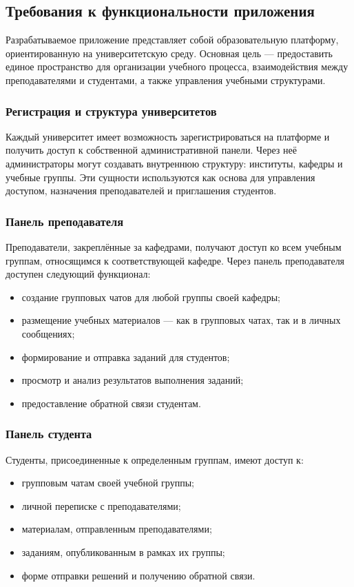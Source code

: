 \subsection{Требования к функциональности приложения}

Разрабатываемое приложение представляет собой образовательную платформу, ориентированную на университетскую среду. Основная цель — предоставить единое пространство для организации учебного процесса, взаимодействия между преподавателями и студентами, а также управления учебными структурами.

\subsubsection{Регистрация и структура университетов}
Каждый университет имеет возможность зарегистрироваться на платформе и получить доступ к собственной административной панели. Через неё администраторы могут создавать внутреннюю структуру: институты, кафедры и учебные группы. Эти сущности используются как основа для управления доступом, назначения преподавателей и приглашения студентов.

\subsubsection{Панель преподавателя}
Преподаватели, закреплённые за кафедрами, получают доступ ко всем учебным группам, относящимся к соответствующей кафедре. Через панель преподавателя доступен следующий функционал:
\begin{itemize}
  \item создание групповых чатов для любой группы своей кафедры;
  \item размещение учебных материалов — как в групповых чатах, так и в личных сообщениях;
  \item формирование и отправка заданий для студентов;
  \item просмотр и анализ результатов выполнения заданий;
  \item предоставление обратной связи студентам.
\end{itemize}

\subsubsection{Панель студента}

Студенты, присоединенные к определенным группам, имеют доступ к:
\begin{itemize}
  \item групповым чатам своей учебной группы;
  \item личной переписке с преподавателями;
  \item материалам, отправленным преподавателями;
  \item заданиям, опубликованным в рамках их группы;
  \item форме отправки решений и получению обратной связи.
\end{itemize}
